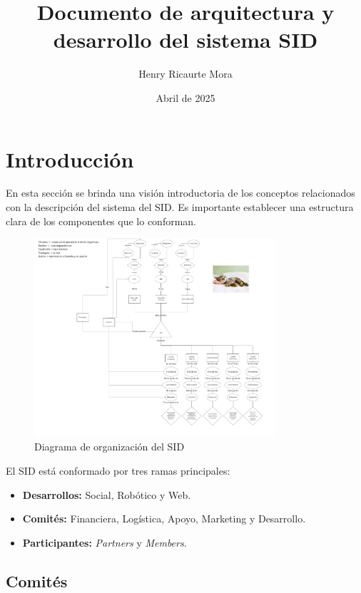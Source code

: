 \documentclass[11pt,a4paper]{article}
\title{Documento de arquitectura y desarrollo del sistema SID}
\author{Henry Ricaurte Mora}
\date{Abril de 2025}
\begin{document}
\maketitle

\tableofcontents

\newpage

\section{Introducción}

En esta sección se brinda una visión introductoria de los conceptos relacionados con la descripción del sistema del SID.
Es importante establecer una estructura clara de los componentes que lo conforman.

\begin{figure}[htbp]
	\centering
	\includegraphics[width=0.8\textwidth]{src/SID_org.pdf}
	\caption{Diagrama de organización del SID}
\end{figure}

El SID está conformado por tres ramas principales:

\begin{itemize}
	\item \textbf{Desarrollos:} Social, Robótico y Web.
	\item \textbf{Comités:} Financiera, Logística, Apoyo, Marketing y Desarrollo.
	\item \textbf{Participantes:} \textit{Partners} y \textit{Members}.
\end{itemize}

\subsection{Comités}
\end{document}
